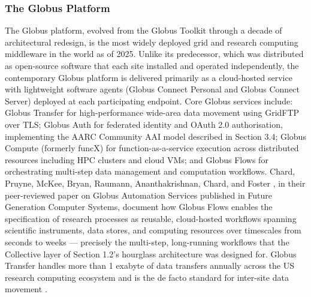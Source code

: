\documentclass[12pt,a4paper]{report}
\begin{document}
\subsubsection*{The Globus Platform}
The Globus platform, evolved from the Globus Toolkit through a decade of architectural redesign, is the most widely deployed grid and research
 computing middleware in the world as of 2025. Unlike its predecessor, which was distributed as open-source software that each site installed
 and operated independently, the contemporary Globus platform is delivered primarily as a cloud-hosted service with lightweight software agents 
 (Globus Connect Personal and Globus Connect Server) deployed at each participating endpoint. Core Globus services include: Globus Transfer for 
 high-performance wide-area data movement using GridFTP over TLS; Globus Auth for federated identity and OAuth 2.0 authorisation, implementing 
 the AARC Community AAI model described in Section 3.4; Globus Compute (formerly funcX) for function-as-a-service execution across distributed 
 resources including HPC clusters and cloud VMs; and Globus Flows for orchestrating multi-step data management and computation workflows. Chard,
  Pruyne, McKee, Bryan, Raumann, Ananthakrishnan, Chard, and Foster \parencite{chard2023}, in their peer-reviewed paper on Globus Automation Services published 
  in Future Generation Computer Systems, document how Globus Flows enables the specification of research processes as reusable, cloud-hosted workflows 
  spanning scientific instruments, data stores, and computing resources over timescales from seconds to weeks — precisely the multi-step, 
  long-running workflows that the Collective layer of Section 1.2's hourglass architecture was designed for. Globus Transfer handles more 
  than 1 exabyte of data transfers annually across the US research computing ecosystem and is the de facto standard for inter-site data movement 
  \parencite{chard2023}.
\end{document}
